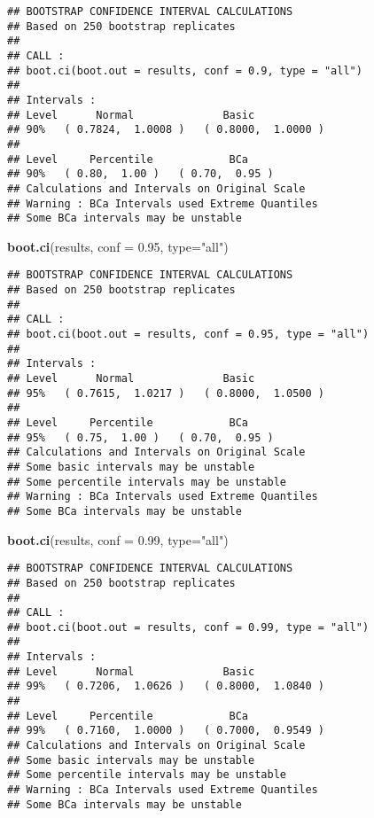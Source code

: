 \documentclass[]{article}
\newenvironment{Shaded}{\begin{snugshade}}{\end{snugshade}}
\newcommand{\KeywordTok}[1]{\textcolor[rgb]{0.13,0.29,0.53}{\textbf{#1}}}
\newcommand{\DataTypeTok}[1]{\textcolor[rgb]{0.13,0.29,0.53}{#1}}
\newcommand{\FloatTok}[1]{\textcolor[rgb]{0.00,0.00,0.81}{#1}}
\newcommand{\StringTok}[1]{\textcolor[rgb]{0.31,0.60,0.02}{#1}}
\newcommand{\NormalTok}[1]{#1}
\begin{document}
\begin{verbatim}
## BOOTSTRAP CONFIDENCE INTERVAL CALCULATIONS
## Based on 250 bootstrap replicates
## 
## CALL : 
## boot.ci(boot.out = results, conf = 0.9, type = "all")
## 
## Intervals : 
## Level      Normal              Basic         
## 90%   ( 0.7824,  1.0008 )   ( 0.8000,  1.0000 )  
## 
## Level     Percentile            BCa          
## 90%   ( 0.80,  1.00 )   ( 0.70,  0.95 )  
## Calculations and Intervals on Original Scale
## Warning : BCa Intervals used Extreme Quantiles
## Some BCa intervals may be unstable
\end{verbatim}

\begin{Shaded}
\begin{Highlighting}[]
\KeywordTok{boot.ci}\NormalTok{(results, }\DataTypeTok{conf =} \FloatTok{0.95}\NormalTok{, }\DataTypeTok{type=}\StringTok{"all"}\NormalTok{)}
\end{Highlighting}
\end{Shaded}

\begin{verbatim}
## BOOTSTRAP CONFIDENCE INTERVAL CALCULATIONS
## Based on 250 bootstrap replicates
## 
## CALL : 
## boot.ci(boot.out = results, conf = 0.95, type = "all")
## 
## Intervals : 
## Level      Normal              Basic         
## 95%   ( 0.7615,  1.0217 )   ( 0.8000,  1.0500 )  
## 
## Level     Percentile            BCa          
## 95%   ( 0.75,  1.00 )   ( 0.70,  0.95 )  
## Calculations and Intervals on Original Scale
## Some basic intervals may be unstable
## Some percentile intervals may be unstable
## Warning : BCa Intervals used Extreme Quantiles
## Some BCa intervals may be unstable
\end{verbatim}

\begin{Shaded}
\begin{Highlighting}[]
\KeywordTok{boot.ci}\NormalTok{(results, }\DataTypeTok{conf =} \FloatTok{0.99}\NormalTok{, }\DataTypeTok{type=}\StringTok{"all"}\NormalTok{)}
\end{Highlighting}
\end{Shaded}

\begin{verbatim}
## BOOTSTRAP CONFIDENCE INTERVAL CALCULATIONS
## Based on 250 bootstrap replicates
## 
## CALL : 
## boot.ci(boot.out = results, conf = 0.99, type = "all")
## 
## Intervals : 
## Level      Normal              Basic         
## 99%   ( 0.7206,  1.0626 )   ( 0.8000,  1.0840 )  
## 
## Level     Percentile            BCa          
## 99%   ( 0.7160,  1.0000 )   ( 0.7000,  0.9549 )  
## Calculations and Intervals on Original Scale
## Some basic intervals may be unstable
## Some percentile intervals may be unstable
## Warning : BCa Intervals used Extreme Quantiles
## Some BCa intervals may be unstable
\end{verbatim}
\end{document}
